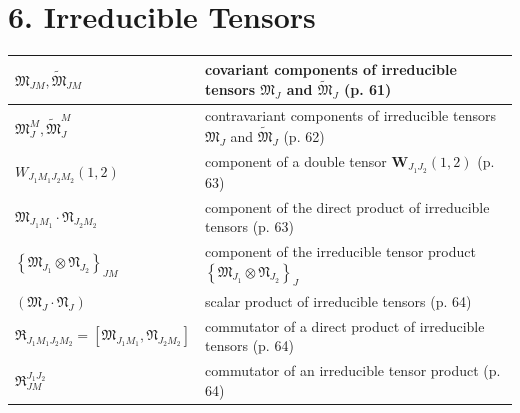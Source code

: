 \section*{6. Irreducible Tensors}
\begin{center}
\begin{tabular}{|l|l|}
\hline
$\mathfrak{M}_{J M}, \widetilde{\mathfrak{M}}_{J M}$ & covariant components of irreducible tensors $\mathfrak{M}_{J}$ and $\tilde{\mathfrak{M}}_{J}$ (p. 61) \\
\hline
$\mathfrak{M}_{J}^{M}, \tilde{\mathfrak{M}}_{J}^{M}$ & contravariant components of irreducible tensors $\mathfrak{M}_{J}$ and $\tilde{\mathfrak{M}}_{J}$ (p. 62) \\
\hline
$W_{J_{1} M_{1} J_{2} M_{2}}(1,2)$ & component of a double tensor $\mathbf{W}_{J_{1} J_{2}}(1,2)$ (p. 63) \\
\hline
$\mathfrak{M}_{J_{1} M_{1}} \cdot \mathfrak{N}_{J_{2} M_{2}}$ & component of the direct product of irreducible tensors (p. 63) \\
\hline
$\left\{\mathfrak{M}_{J_{1}} \otimes \mathfrak{N}_{J_{2}}\right\}_{J M}$ & component of the irreducible tensor product $\left\{\mathfrak{M}_{J_{1}} \otimes \mathfrak{N}_{J_{2}}\right\}_{J}$ \\
\hline
$\left(\mathfrak{M}_{J} \cdot \mathfrak{N}_{J}\right)$ & scalar product of irreducible tensors (p. 64) \\
\hline
$\Re_{J_{1} M_{1} J_{2} M_{2}}=\left[\mathfrak{M}_{J_{1} M_{1}}, \mathfrak{N}_{J_{2} M_{2}}\right]$ & commutator of a direct product of irreducible tensors (p. 64) \\
\hline
$\Re_{J M}^{J_{1} J_{2}}$ & commutator of an irreducible tensor product (p. 64) \\
\hline
\end{tabular}
\end{center}

